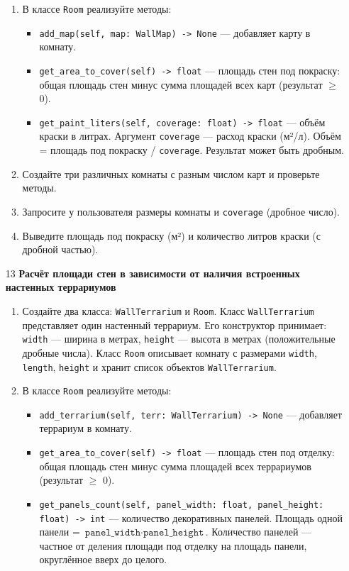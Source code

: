 \begin{enumerate}
\begin{enumerate}
    \item В классе \texttt{Room} реализуйте методы:  
    \begin{itemize}
        \item \texttt{add\_map(self, map: WallMap) -> None} — добавляет карту в комнату.
        \item \texttt{get\_area\_to\_cover(self) -> float} — площадь стен под покраску: общая площадь стен минус сумма площадей всех карт (результат $\geqslant$ 0).
        \item \texttt{get\_paint\_liters(self, coverage: float) -> float} — объём краски в литрах. Аргумент \texttt{coverage} — расход краски (м²/л). Объём = площадь под покраску / \texttt{coverage}. Результат может быть дробным.
    \end{itemize}

    \item Создайте три различных комнаты с разным числом карт и проверьте методы.

    \item Запросите у пользователя размеры комнаты и \texttt{coverage} (дробное число).

    \item Выведите площадь под покраску (м²) и количество литров краски (с дробной частью).
\end{enumerate}

\item[13] \textbf{Расчёт площади стен в зависимости от наличия встроенных настенных террариумов}
\begin{enumerate}
    \item Создайте два класса: \texttt{WallTerrarium} и \texttt{Room}.  
    Класс \texttt{WallTerrarium} представляет один настенный террариум. Его конструктор принимает:  
    \texttt{width} — ширина в метрах,  
    \texttt{height} — высота в метрах (положительные дробные числа).  
    Класс \texttt{Room} описывает комнату с размерами \texttt{width}, \texttt{length}, \texttt{height} и хранит список объектов \texttt{WallTerrarium}.

    \item В классе \texttt{Room} реализуйте методы:  
    \begin{itemize}
        \item \texttt{add\_terrarium(self, terr: WallTerrarium) -> None} — добавляет террариум в комнату.
        \item \texttt{get\_area\_to\_cover(self) -> float} — площадь стен под отделку: общая площадь стен минус сумма площадей всех террариумов (результат $\geqslant$ 0).
        \item \texttt{get\_panels\_count(self, panel\_width: float, panel\_height: float) -> int} — количество декоративных панелей. Площадь одной панели = \(\texttt{panel\_width} \cdot \texttt{panel\_height}\). Количество панелей — частное от деления площади под отделку на площадь панели, округлённое вверх до целого.
    \end{itemize}


\end{enumerate}
\end{enumerate}
